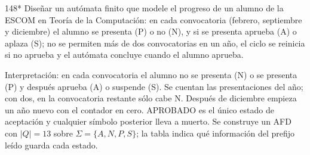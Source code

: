 \documentclass[11pt]{article}
\begin{document}
\begin{ejercicio}{148}{*}
Diseñar un autómata finito que modele el progreso de un alumno de la ESCOM en Teoría de la Computación: en cada convocatoria (febrero, septiembre y diciembre) el alumno se presenta (P) o no (N), y si se presenta aprueba (A) o aplaza (S); no se permiten más de dos convocatorias en un año, el ciclo se reinicia si no aprueba y el autómata concluye cuando el alumno aprueba.
\end{ejercicio}
\proc Interpretación: en cada convocatoria el alumno no se presenta (N) o se presenta (P) y después aprueba (A) o suspende (S). Se cuentan las presentaciones del año; con dos, en la convocatoria restante sólo cabe N. Después de diciembre empieza un año nuevo con el contador en cero. APROBADO es el único estado de aceptación y cualquier símbolo posterior lleva a muerto. Se construye un AFD con $|Q| = 13$ sobre $\Sigma = \{A, N, P, S\}$; la tabla indica qué información del prefijo leído guarda cada estado.
\end{document}
